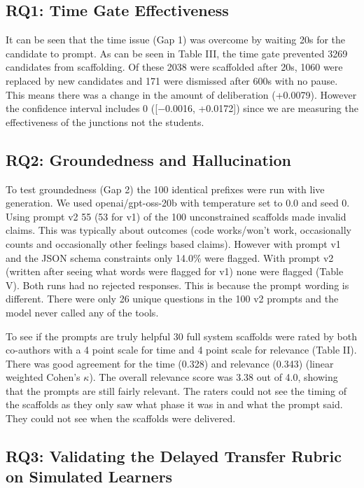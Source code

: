 \documentclass[conference]{IEEEtran}
\begin{document}
\subsection{RQ1: Time Gate Effectiveness}

It can be seen that the time issue (Gap 1) was overcome by waiting 20s for the candidate to prompt. As can be seen in Table III, the time gate prevented 3269 candidates from scaffolding. Of these 2038 were scaffolded after 20s, 1060 were replaced by new candidates and 171 were dismissed after 600s with no pause. This means there was a change in the amount of deliberation (+0.0079). However the confidence interval includes 0 ([$-$0.0016, +0.0172]) since we are measuring the effectiveness of the junctions not the students.

\subsection{RQ2: Groundedness and Hallucination}

{\setlength{\tabcolsep}{3pt}}

To test groundedness (Gap 2) the 100 identical prefixes were run with live generation. We used openai/gpt-oss-20b with temperature set to 0.0 and seed 0. Using prompt v2 55 (53 for v1) of the 100 unconstrained scaffolds made invalid claims. This was typically about outcomes (code works/won't work, occasionally counts and occasionally other feelings based claims). However with prompt v1 and the JSON schema constraints only 14.0\% were flagged. With prompt v2 (written after seeing what words were flagged for v1) none were flagged (Table V). Both runs had no rejected responses. This is because the prompt wording is different. There were only 26 unique questions in the 100 v2 prompts and the model never called any of the tools.

To see if the prompts are truly helpful 30 full system scaffolds were rated by both co-authors with a 4 point scale for time and 4 point scale for relevance (Table II). There was good agreement for the time (0.328) and relevance (0.343) (linear weighted Cohen's $\kappa$). The overall relevance score was 3.38 out of 4.0, showing that the prompts are still fairly relevant. The raters could not see the timing of the scaffolds as they only saw what phase it was in and what the prompt said. They could not see when the scaffolds were delivered.

\subsection{RQ3: Validating the Delayed Transfer Rubric on Simulated Learners}
\end{document}
